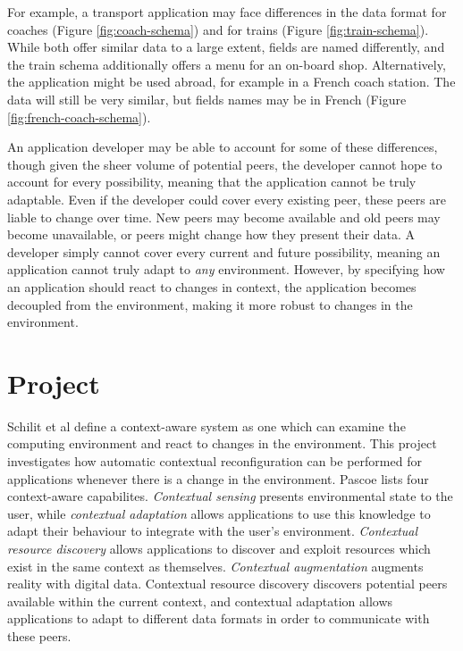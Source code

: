 \documentclass[12pt,twoside,notitlepage]{report}
\begin{document}
For example, a transport application may face differences in the data format for coaches (Figure \ref{fig:coach-schema}) and for trains (Figure \ref{fig:train-schema}). 
While both offer similar data to a large extent, fields are named differently, and the train schema additionally offers a menu for an on-board shop.
Alternatively, the application might be used abroad, for example in a French coach station. The data will still be very similar, but fields names may be in French (Figure \ref{fig:french-coach-schema}).

An application developer may be able to account for some of these differences, though given the sheer volume of potential peers, the developer cannot hope to account for every possibility, meaning that the application cannot be truly adaptable. 
Even if the developer could cover every existing peer, these peers are liable to change over time. 
New peers may become available and old peers may become unavailable, or peers might change how they present their data. 
A developer simply cannot cover every current and future possibility, meaning an application cannot truly adapt to {\sl any} environment. 
However, by specifying how an application should react to changes in context, the application becomes decoupled from the environment, making it more robust to changes in the environment. 


\section{Project}

Schilit et al \cite{schilit1994context}  define a context-aware system as one which can examine the computing environment and react to changes in the environment. 
This project investigates how automatic contextual reconfiguration can be performed for applications whenever there is a change in the environment. 
Pascoe \cite{pascoe1998adding} lists four context-aware capabilites. 
{\sl Contextual sensing} presents environmental state to the user, while {\sl contextual adaptation} allows applications to use this knowledge to adapt their behaviour to integrate with the user's environment.
{\sl Contextual resource discovery} allows applications to discover and exploit resources which exist in the same context as themselves. 
{\sl Contextual augmentation} augments reality with digital data. 
Contextual resource discovery discovers potential peers available within the current context, and contextual adaptation allows applications to adapt to different data formats in order to communicate with these peers. 
\end{document}
